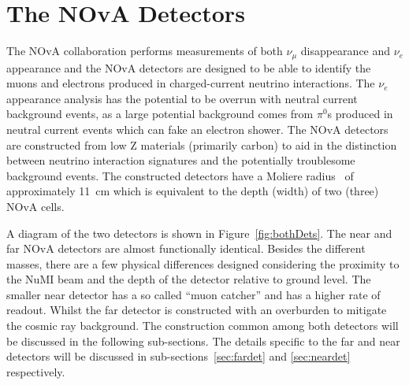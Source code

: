 \section{The NOvA Detectors}




The NOvA collaboration performs measurements of both $\nu_{\mu}$
disappearance and $\nu_e$ appearance and the NOvA detectors are
designed to be able to identify the muons and electrons produced in
charged-current neutrino interactions. 
The $\nu_e$ appearance
analysis has the potential to be overrun with neutral current
background events, 
as a large potential background comes from $\pi^0$s produced in
neutral current 
events which can fake an electron shower.
The NOvA detectors are constructed from low Z materials (primarily
carbon) to aid in the distinction between neutrino interaction
signatures and the potentially troublesome background events.
The constructed detectors have a Moliere radius~\cite{pdg} of
approximately 11~cm which is equivalent to the depth (width) of two
(three) NOvA cells.  

A diagram of the two detectors
is shown in Figure~\ref{fig:bothDets}. 
The near and far NOvA detectors are almost functionally
identical. Besides
the different masses, there are a few physical
differences designed considering the proximity to the NuMI beam and
the depth of the detector relative to ground level. 
The smaller near detector has a so called ``muon catcher'' and
has a higher rate of readout. 
Whilst the far detector is constructed with an overburden to mitigate
the cosmic ray background.
The
construction common among both detectors will be discussed in the
following sub-sections. The details specific to the far and near detectors
will be discussed in sub-sections~\ref{sec:fardet} and
\ref{sec:neardet} respectively.

